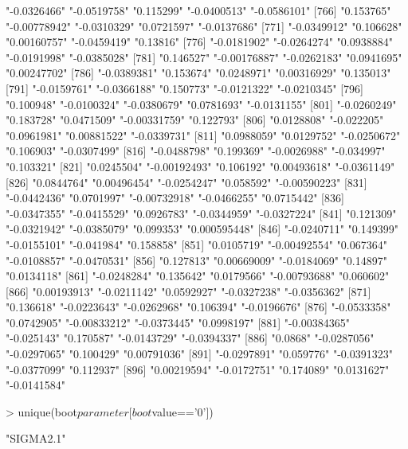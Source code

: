 \begin{Schunk}
\begin{Soutput}
[761] "-0.0326466"   "-0.0519758"   "0.115299"     "-0.0400513"   "-0.0586101"  
[766] "0.153765"     "-0.00778942"  "-0.0310329"   "0.0721597"    "-0.0137686"  
[771] "-0.0349912"   "0.106628"     "0.00160757"   "-0.0459419"   "0.13816"     
[776] "-0.0181902"   "-0.0264274"   "0.0938884"    "-0.0191998"   "-0.0385028"  
[781] "0.146527"     "-0.00176887"  "-0.0262183"   "0.0941695"    "0.00247702"  
[786] "-0.0389381"   "0.153674"     "0.0248971"    "0.00316929"   "0.135013"    
[791] "-0.0159761"   "-0.0366188"   "0.150773"     "-0.0121322"   "-0.0210345"  
[796] "0.100948"     "-0.0100324"   "-0.0380679"   "0.0781693"    "-0.0131155"  
[801] "-0.0260249"   "0.183728"     "0.0471509"    "-0.00331759"  "0.122793"    
[806] "0.0128808"    "-0.022205"    "0.0961981"    "0.00881522"   "-0.0339731"  
[811] "0.0988059"    "0.0129752"    "-0.0250672"   "0.106903"     "-0.0307499"  
[816] "-0.0488798"   "0.199369"     "-0.0026988"   "-0.034997"    "0.103321"    
[821] "0.0245504"    "-0.00192493"  "0.106192"     "0.00493618"   "-0.0361149"  
[826] "0.0844764"    "0.00496454"   "-0.0254247"   "0.058592"     "-0.00590223" 
[831] "-0.0442436"   "0.0701997"    "-0.00732918"  "-0.0466255"   "0.0715442"   
[836] "-0.0347355"   "-0.0415529"   "0.0926783"    "-0.0344959"   "-0.0327224"  
[841] "0.121309"     "-0.0321942"   "-0.0385079"   "0.099353"     "0.000595448" 
[846] "-0.0240711"   "0.149399"     "-0.0155101"   "-0.041984"    "0.158858"    
[851] "0.0105719"    "-0.00492554"  "0.067364"     "-0.0108857"   "-0.0470531"  
[856] "0.127813"     "0.00669009"   "-0.0184069"   "0.14897"      "0.0134118"   
[861] "-0.0248284"   "0.135642"     "0.0179566"    "-0.00793688"  "0.060602"    
[866] "0.00193913"   "-0.0211142"   "0.0592927"    "-0.0327238"   "-0.0356362"  
[871] "0.136618"     "-0.0223643"   "-0.0262968"   "0.106394"     "-0.0196676"  
[876] "-0.0533358"   "0.0742905"    "-0.00833212"  "-0.0373445"   "0.0998197"   
[881] "-0.00384365"  "-0.025143"    "0.170587"     "-0.0143729"   "-0.0394337"  
[886] "0.0868"       "-0.0287056"   "-0.0297065"   "0.100429"     "0.00791036"  
[891] "-0.0297891"   "0.059776"     "-0.0391323"   "-0.0377099"   "0.112937"    
[896] "0.00219594"   "-0.0172751"   "0.174089"     "0.0131627"    "-0.0141584"  
\end{Soutput}
\begin{Sinput}
> unique(boot$parameter[boot$value=='0'])
\end{Sinput}
\begin{Soutput}
[1] "SIGMA2.1"
\end{Soutput}
\end{Schunk}
